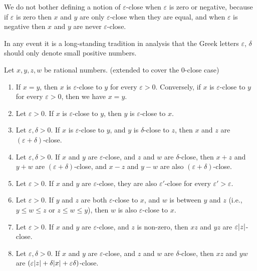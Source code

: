 \begin{note}
    We do not bother defining a notion of \(\varepsilon\)-close when \(\varepsilon\) is zero or negative, because if \(\varepsilon\) is zero then \(x\) and \(y\) are only \(\varepsilon\)-close when they are equal, and when \(\varepsilon\) is negative then \(x\) and \(y\) are never \(\varepsilon\)-close.
\end{note}

\begin{note}
    In any event it is a long-standing tradition in analysis that the Greek letters \(\varepsilon\), \(\delta\) should only denote small positive numbers.
\end{note}

\setcounter{theorem}{6}
\begin{proposition}\label{4.3.7}
    Let \(x, y, z, w\) be rational numbers.
    (extended to cover the \(0\)-close case)
    \begin{enumerate}
        \item If \(x = y\), then \(x\) is \(\varepsilon\)-close to \(y\) for every \(\varepsilon > 0\).
              Conversely, if \(x\) is \(\varepsilon\)-close to \(y\) for every \(\varepsilon > 0\), then we have \(x = y\).
        \item Let \(\varepsilon > 0\).
              If \(x\) is \(\varepsilon\)-close to \(y\), then \(y\) is \(\varepsilon\)-close to \(x\).
        \item Let \(\varepsilon, \delta > 0\).
              If \(x\) is \(\varepsilon\)-close to \(y\), and \(y\) is \(\delta\)-close to \(z\), then \(x\) and \(z\) are \((\varepsilon + \delta)\)-close.
        \item Let \(\varepsilon, \delta > 0\).
              If \(x\) and \(y\) are \(\varepsilon\)-close, and \(z\) and \(w\) are \(\delta\)-close, then \(x + z\) and \(y + w\) are \((\varepsilon + \delta)\)-close, and \(x - z\) and \(y - w\) are also \((\varepsilon + \delta)\)-close.
        \item Let \(\varepsilon > 0\).
              If \(x\) and \(y\) are \(\varepsilon\)-close, they are also \(\varepsilon'\)-close for every \(\varepsilon' > \varepsilon\).
        \item Let \(\varepsilon > 0\).
              If \(y\) and \(z\) are both \(\varepsilon\)-close to \(x\), and \(w\) is between \(y\) and \(z\) (i.e., \(y \leq w \leq z\) or \(z \leq w \leq y\)), then \(w\) is also \(\varepsilon\)-close to \(x\).
        \item Let \(\varepsilon > 0\).
              If \(x\) and \(y\) are \(\varepsilon\)-close, and \(z\) is non-zero, then \(xz\) and \(yz\) are \(\varepsilon\abs*{z}\)-close.
        \item Let \(\varepsilon, \delta > 0\).
              If \(x\) and \(y\) are \(\varepsilon\)-close, and \(z\) and \(w\) are \(\delta\)-close, then \(xz\) and \(yw\) are \((\varepsilon\abs*{z} + \delta\abs*{x} + \varepsilon\delta)\)-close.
    \end{enumerate}
\end{proposition}

